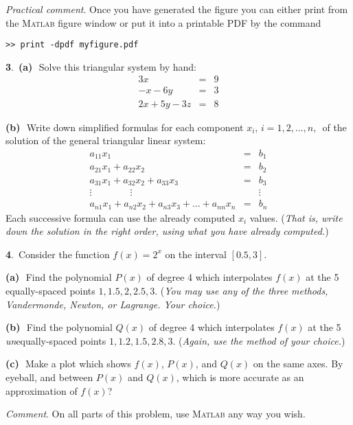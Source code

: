 \documentclass[12pt]{amsart}
\newcommand{\prob}[1]{\bigskip\noindent\large\textbf{#1}.\,\normalsize }
\newcommand{\ppart}[1]{\textbf{(#1)}\,\, }
\newcommand{\epart}[1]{\medskip\noindent\textbf{(#1)}\,\, }
\newcommand{\Matlab}{\textsc{Matlab}\xspace}
\begin{document}
\emph{Practical comment}.  Once you have generated the figure you can either print from the \Matlab figure window or put it into a printable PDF by the command

\small \texttt{>> print -dpdf myfigure.pdf}

\prob{3}  \ppart{a} Solve this triangular system by hand:
$$\begin{array}{lcl}
3x & = & 9 \\
-x - 6y    & = & 3 \\
2x + 5y - 3 z & = & 8
\end{array}$$

\epart{b} Write down simplified formulas for each component $x_i,\, i=1,2,\dots,n,\,$ of the solution of the general triangular linear system:
$$\begin{array}{lcl}
a_{11} x_1      &=& b_1 \\
a_{21} x_1 + a_{22} x_2     &=& b_2 \\
a_{31} x_1 + a_{32} x_2 + a_{33} x_3  &=& b_3 \\
\vdots  \qquad \qquad \vdots & & \vdots \\
a_{n1} x_1 + a_{n2} x_2 + a_{n3} x_3 + \dots + a_{nn} x_n &=& b_n
\end{array}$$
Each successive formula can use the already computed $x_i$ values.  (\emph{That is, write down the solution in the right order, using what you have already computed.})

\prob{4}  Consider the function $f(x) = 2^x$ on the interval $[0.5,3]$.

\epart{a} Find the polynomial $P(x)$ of degree 4 which interpolates $f(x)$ at the 5 equally-spaced points $1,1.5,2,2.5,3$.  (\emph{You may use any of the three methods, Vandermonde, Newton, or Lagrange.  Your choice.})

\epart{b} Find the polynomial $Q(x)$ of degree 4 which interpolates $f(x)$ at the 5 \emph{un}equally-spaced points $1,1.2,1.5,2.8,3$.  (\emph{Again, use the method of your choice.})

\epart{c} Make a plot which shows $f(x)$, $P(x)$, and $Q(x)$ on the same axes.  By eyeball, and between $P(x)$ and $Q(x)$, which is more accurate as an approximation of $f(x)$?

\medskip\noindent\emph{Comment}.  On all parts of this problem, use \Matlab any way you wish.
\end{document}

